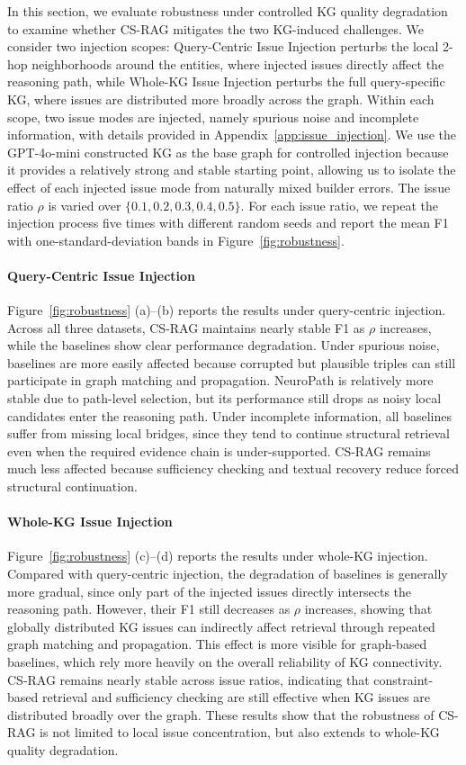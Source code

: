 \documentclass{article}
\theoremstyle{plain}
\theoremstyle{definition}
\theoremstyle{remark}
\begin{document}
In this section, we evaluate robustness under controlled KG quality degradation to examine whether CS-RAG mitigates the two KG-induced challenges.  We consider two injection scopes: Query-Centric Issue Injection perturbs the local 2-hop neighborhoods around the entities, where injected issues directly affect the reasoning path, while Whole-KG Issue Injection perturbs the full query-specific KG, where issues are distributed more broadly across the graph. Within each scope, two issue modes are injected, namely spurious noise and incomplete information, with details provided in Appendix~\ref{app:issue_injection}. We use the GPT-4o-mini constructed KG as the base graph for controlled injection because it provides a relatively strong and stable starting point, allowing us to isolate the effect of each injected issue mode from naturally mixed builder errors. The issue ratio $\rho$ is varied over $\{0.1, 0.2, 0.3, 0.4, 0.5\}$. For each issue ratio, we repeat the injection process five times with different random seeds and report the mean F1 with one-standard-deviation bands in Figure~\ref{fig:robustness}.

\paragraph{Query-Centric Issue Injection} Figure~\ref{fig:robustness} (a)--(b) reports the results under query-centric injection. Across all three datasets, CS-RAG maintains nearly stable F1 as $\rho$ increases, while the baselines show clear performance degradation. Under spurious noise, baselines are more easily affected because corrupted but plausible triples can still participate in graph matching and propagation. NeuroPath is relatively more stable due to path-level selection, but its performance still drops as noisy local candidates enter the reasoning path. Under incomplete information, all baselines suffer from missing local bridges, since they tend to continue structural retrieval even when the required evidence chain is under-supported. CS-RAG remains much less affected because sufficiency checking and textual recovery reduce forced structural continuation.


\paragraph{Whole-KG Issue Injection} Figure~\ref{fig:robustness} (c)--(d) reports the results under whole-KG injection. Compared with query-centric injection, the degradation of baselines is generally more gradual, since only part of the injected issues directly intersects the reasoning path. However, their F1 still decreases as $\rho$ increases, showing that globally distributed KG issues can indirectly affect retrieval through repeated graph matching and propagation. This effect is more visible for graph-based baselines, which rely more heavily on the overall reliability of KG connectivity. CS-RAG remains nearly stable across issue ratios, indicating that constraint-based retrieval and sufficiency checking are still effective when KG issues are distributed broadly over the graph. These results show that the robustness of CS-RAG is not limited to local issue concentration, but also extends to whole-KG quality degradation.
\end{document}
